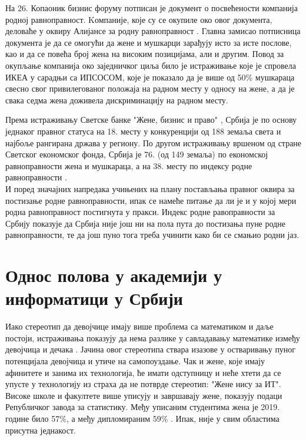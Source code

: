 \documentclass[a4paper]{article}
\begin{document}
На 26. Копаоник бизнис форуму потписан је документ о посвећености компанија родној равноправност.
Kомпаније, које су се окупиле око овог документа, деловаће у оквиру Алијансе за родну 
равноправност \cite{alijansa}. Главна замисао потписница документа је да се омогући да жене и 
мушкарци зарађују исто за исте послове, као и да се повећа број жена на високим позицијама, али и 
другим. Повод за окупљање компанија око заједничког циља било је истраживање које је спровела ИКЕА
у сарадњи са ИПСОСОМ, које је показало да је више од 50\% мушкараца свесно свог привилегованог 
положаја на радном месту у односу на жене, а да је свака седма жена доживела дискриминацију 
на радном месту.

Према истраживању Светске банке "Жене, бизнис и право" \cite{banka}, Србија је по основу једнаког 
правног статуса на 18. месту у конкуренцији од 188 земаља света и најбоље рангирана држава у 
региону. По другом истраживању вршеном од стране Светског економског фонда, Србија је 76. 
(од 149 земаља) по економској равноправности жена и мушкараца, а на 38. месту по индексу родне 
равноправности \cite{danas}.\\

И поред значајних напредака учињених на плану постављања правног оквира за постизање родне 
равноправности, ипак се намеће питање да ли је и у којој мери родна равноправност постигнута у 
пракси. Индекс родне равоправности за Србију показује да Србија није још ни на пола пута до 
постизања пуне родне равноправности, те да још пуно тога треба учинити како би се смањио 
родни јаз.  

\section{Однос полова у академији у информатици у Србији}

Иако стереотип да девојчице имају више проблема са математиком и даље постоји, 
истраживања показују да нема разлике у савладавању математике између девојчица 
и дечака \cite{stereotip}. Јачина овог стереотипа ствара изазове у остваривању 
пуног потенцијала девојчица и утиче на самопоуздање. Чак и жене, које имају 
афинитете и занима их технологија, ће имати одступницу и неће хтети да се упусте 
у технологију из страха да не потврде стереотип: "Жене нису за ИТ".\\

Високе школе и факултете више уписују и завршавају жене, показују подаци Републичког 
завода за статистику. Међу уписаним студентима жена је 2019. године било 57\%,
а међу дипломираним 59\% \cite{zene_i_musk_u_Srb}. Ипак, није у свим областима присутна једнакост.
\end{document}
